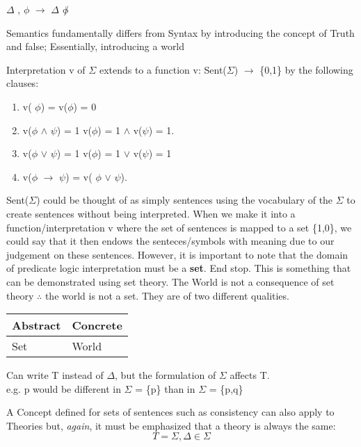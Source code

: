 \documentclass[11pt]{article}
\begin{document}
\(\Delta\) , \(\phi\) \vdash \bot \(\rightarrow\) \(\Delta\) \vdash \(\not \phi\)

Semantics fundamentally differs from Syntax by introducing the concept of Truth 
and false; Essentially, introducing a world

Interpretation v of \(\Sigma\) extends to a function v: Sent(\(\Sigma\)) \(\rightarrow\) \{0,1\}
by the following clauses:
\begin{enumerate}
\item v(\textlnot{} \(\phi\)) = \iff v(\(\phi\)) = 0
\item v(\(\phi\) \(\wedge\) \(\psi\)) = 1 \iff v(\(\phi\)) = 1 \(\wedge\) v(\(\psi\)) = 1.
\item v(\(\phi\) \(\vee\) \(\psi\)) = 1 \iff v(\(\phi\)) = 1 \(\vee\) v(\(\psi\)) = 1
\item v(\(\phi\) \(\rightarrow\) \(\psi\)) = v(\textlnot{} \(\phi\) \(\vee\) \(\psi\)).
\end{enumerate}

Sent(\(\Sigma\)) could be thought of as simply sentences using the vocabulary of the \(\Sigma\) to create sentences without
being interpreted. When we make it into a function/interpretation v where the set of sentences is mapped
to a set \{1,0\}, we could say that it then endows the senteces/symbols with meaning due to our judgement on these
sentences. However, it is important to note that the domain of predicate logic interpretation must be a \textbf{set}. End stop. This
is something that can be demonstrated using set theory. The World is not a consequence of set theory \(\therefore\) the world is not a set.
They are of two different qualities.

\begin{center}
\begin{tabular}{ll}
Abstract & Concrete\\
\hline
Set & World\\
\end{tabular}
\end{center}

Can write T instead of \(\Delta\), but the formulation of \(\Sigma\) affects T.\\
e.g. p would be different in \(\Sigma\) = \{p\} than in \(\Sigma\) = \{p,q\}

A Concept defined for sets of sentences such as consistency can also apply
to Theories but, \emph{again}, it must be emphasized that a theory is always the same:
\[T = {\Sigma , \Delta \in \Sigma}\]
\end{document}
